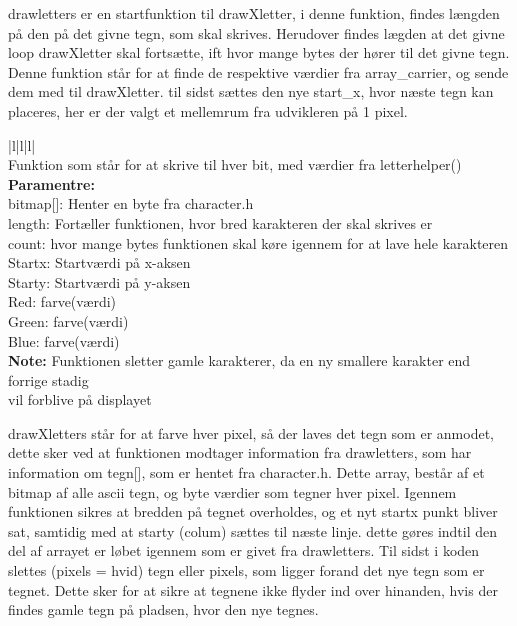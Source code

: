 drawletters er en startfunktion til drawXletter, i denne funktion, findes længden på den på det givne tegn, som skal skrives. Herudover findes lægden at det givne loop drawXletter skal fortsætte, ift hvor mange bytes der hører til det givne tegn. Denne funktion står for at finde de respektive værdier fra array\_carrier, og sende dem med til drawXletter.  til sidst sættes den nye start\_x, hvor næste tegn kan placeres, her er der valgt et mellemrum fra udvikleren på 1 pixel.

\begin{center}
\begin{tabular}{ |l|l|l| }
\hline
{} \\
\hline
Funktion som står for at skrive til hver bit, med værdier fra letterhelper()\\
\hline
\textbf{Paramentre:}  \\bitmap[]: Henter en byte fra character.h\\ length: Fortæller funktionen, hvor bred karakteren der skal skrives er\\ count: hvor mange bytes funktionen skal køre igennem for at lave hele karakteren\\ Startx: Startværdi på x-aksen \\Starty: Startværdi på y-aksen\\ Red: farve(værdi)\\ Green: farve(værdi) \\ Blue: farve(værdi)\\
\textbf{Note:} Funktionen sletter gamle karakterer, da en ny smallere karakter end forrige stadig\\ vil forblive på displayet\\

\hline
\end{tabular}
\end{center}  

drawXletters står for at farve hver pixel, så der laves det tegn som er anmodet, dette sker ved at funktionen modtager information fra drawletters, som har information om tegn[], som er hentet fra character.h. Dette array, består af et bitmap af alle ascii tegn, og byte værdier som tegner hver pixel. Igennem funktionen sikres at bredden på tegnet overholdes, og et nyt startx punkt bliver sat, samtidig med at starty (colum) sættes til næste linje. dette gøres indtil den del af arrayet er løbet igennem som er givet fra drawletters. Til sidst i koden slettes (pixels = hvid) tegn eller pixels, som ligger forand det nye tegn som er tegnet. Dette sker for at sikre at tegnene ikke flyder ind over hinanden, hvis der findes gamle tegn på pladsen, hvor den nye tegnes. 


